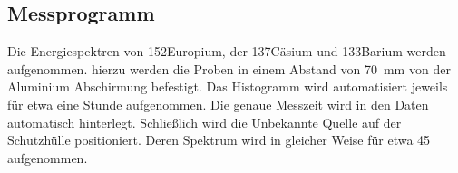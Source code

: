 \subsection{Messprogramm}
Die Energiespektren von 152Europium, der 137Cäsium und 133Barium werden
aufgenommen. hierzu werden die Proben in einem Abstand von \qty{70}{\mm} von
der Aluminium Abschirmung befestigt. Das Histogramm wird automatisiert jeweils
für etwa eine Stunde aufgenommen. Die genaue Messzeit wird in den Daten
automatisch hinterlegt. Schließlich wird die Unbekannte Quelle auf der
Schutzhülle positioniert. Deren Spektrum wird in gleicher Weise für etwa
\qty{45}{\min} aufgenommen.



